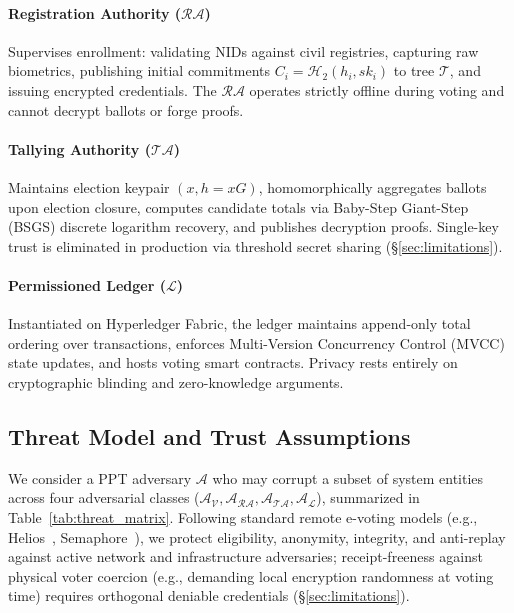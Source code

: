 \documentclass[10pt,letterpaper,journal]{IEEEtran}
\begin{document}
\paragraph{Registration Authority ($\mathcal{RA}$)} Supervises enrollment: validating NIDs against civil registries, capturing raw biometrics, publishing initial commitments $C_i = \mathcal{H}_2(h_i, sk_i)$ to tree $\mathcal{T}$, and issuing encrypted credentials. The $\mathcal{RA}$ operates strictly offline during voting and cannot decrypt ballots or forge proofs.

\paragraph{Tallying Authority ($\mathcal{TA}$)} Maintains election keypair $(x, h=xG)$, homomorphically aggregates ballots upon election closure, computes candidate totals via Baby-Step Giant-Step (BSGS) discrete logarithm recovery, and publishes decryption proofs. Single-key trust is eliminated in production via threshold secret sharing (\S\ref{sec:limitations}).

\paragraph{Permissioned Ledger ($\mathcal{L}$)} Instantiated on Hyperledger Fabric, the ledger maintains append-only total ordering over transactions, enforces Multi-Version Concurrency Control (MVCC) state updates, and hosts voting smart contracts. Privacy rests entirely on cryptographic blinding and zero-knowledge arguments.


\subsection{Threat Model and Trust Assumptions}
We consider a PPT adversary $\mathcal{A}$ who may corrupt a subset of system entities across four adversarial classes ($\mathcal{A}_{\mathcal{V}}, \mathcal{A}_{\mathcal{RA}}, \mathcal{A}_{\mathcal{TA}}, \mathcal{A}_{\mathcal{L}}$), summarized in Table~\ref{tab:threat_matrix}. Following standard remote e-voting models (e.g., Helios~\cite{Adida2008}, Semaphore~\cite{Gurkan2020}), we protect eligibility, anonymity, integrity, and anti-replay against active network and infrastructure adversaries; receipt-freeness against physical voter coercion (e.g., demanding local encryption randomness at voting time) requires orthogonal deniable credentials (\S\ref{sec:limitations}).
\end{document}
